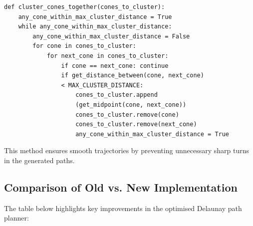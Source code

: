 \documentclass[a4paper,11pt]{report}
\begin{document}
\begin{verbatim}
def cluster_cones_together(cones_to_cluster):
    any_cone_within_max_cluster_distance = True
    while any_cone_within_max_cluster_distance:
        any_cone_within_max_cluster_distance = False
        for cone in cones_to_cluster:
            for next_cone in cones_to_cluster:
                if cone == next_cone: continue
                if get_distance_between(cone, next_cone) 
                < MAX_CLUSTER_DISTANCE:
                    cones_to_cluster.append
                    (get_midpoint(cone, next_cone))
                    cones_to_cluster.remove(cone)
                    cones_to_cluster.remove(next_cone)
                    any_cone_within_max_cluster_distance = True
\end{verbatim}

This method ensures smooth trajectories by preventing unnecessary sharp turns in the generated paths.

\subsection{Comparison of Old vs. New Implementation}

The table below highlights key improvements in the optimised Delaunay path planner:

\begin{table}[h]
    \centering
    \caption{Comparison between the old and new Delaunay path planners.}
    \label{tab:delaunay_comparison}
\end{table}
\end{document}
